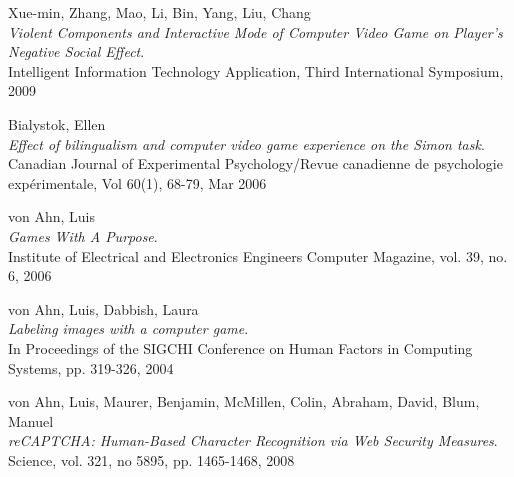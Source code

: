 \begin{thebibliography}{99}
  {\sc Xue-min,} Zhang, {\sc Mao,} Li, {\sc Bin,} Yang, {\sc Liu,} Chang\\
  \emph{Violent Components and Interactive Mode of Computer Video Game on Player's Negative Social Effect}.\\
  Intelligent Information Technology Application, Third International Symposium, 2009

  {\sc Bialystok,} Ellen\\
  \emph{Effect of bilingualism and computer video game experience on the Simon task}.\\
  Canadian Journal of Experimental Psychology/Revue canadienne de psychologie expérimentale, Vol 60(1), 68-79, Mar 2006
  
  {\sc von Ahn,} Luis\\
  \emph{Games With A Purpose}.\\
  Institute of Electrical and Electronics Engineers Computer Magazine, vol. 39, no. 6, 2006

  {\sc von Ahn,} Luis, {\sc Dabbish,} Laura\\
  \emph{Labeling images with a computer game}.\\
  In Proceedings of the SIGCHI Conference on Human Factors in Computing Systems, pp. 319-326, 2004
 
  {\sc von Ahn,} Luis, {\sc Maurer,} Benjamin, {\sc McMillen,} Colin, {\sc Abraham,} David, {\sc Blum,} Manuel\\
  \emph{reCAPTCHA: Human-Based Character Recognition via Web Security Measures}.\\
  Science, vol. 321, no 5895, pp. 1465-1468, 2008
 
\end{thebibliography}
